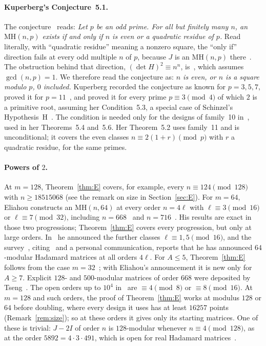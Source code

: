 \documentclass[10pt]{article}
\theoremstyle{remark}
\newcommand{\MH}{\mathrm{MH}}
\begin{document}
\paragraph{Kuperberg's Conjecture~5.1.}
The conjecture~\cite[Conjecture~5.1]{K} reads: \emph{Let $p$ be an odd prime. For all but finitely many $n$, an $\MH(n,p)$ exists if and only if $n$ is even or a quadratic residue of $p$.} Read literally, with ``quadratic residue'' meaning a nonzero square, the ``only if'' direction fails at every odd multiple $n$ of $p$, because $J$ is an $\MH(n,p)$ there~\cite[Lemma~2.3]{K}. The obstruction behind that direction, $(\det H)^2\equiv n^n$, is~\cite[Lemma~2.2]{K}, which assumes $\gcd(n,p)=1$. We therefore read the conjecture as: \emph{$n$ is even, or $n$ is a square modulo $p$, $0$ included.} Kuperberg recorded the conjecture as known for $p=3,5,7$, proved it for $p=11$~\cite[Corollary~5.5]{K}, and proved it for every prime $p\equiv3\pmod4$ of which $2$ is a primitive root, assuming her Condition~5.3, a special case of Schinzel's Hypothesis~H~\cite[Theorem~5.4]{K}. The condition is needed only for the designs of family~10 in~\cite{IT07}, used in her Theorems~5.4 and~5.6. Her Theorem~5.2 uses family~11 and is unconditional; it covers the even classes $n\equiv2(1+r)\pmod p$ with $r$ a quadratic residue, for the same primes.

\paragraph{Powers of $2$.}
At $m=128$, Theorem~\ref{thm:E} covers, for example, every $n\equiv124\pmod{128}$ with $n\ge18515068$ (see the remark on size in Section~\ref{sec:E}). For $m=64$, Eliahou constructs an $\MH(n,64)$ at every order $n=4\ell$ with $\ell\equiv3\pmod{16}$ or $\ell\equiv7\pmod{32}$, including $n=668$~\cite{E25} and $n=716$~\cite[abstract]{E26}. His results are exact in those two progressions; Theorem~\ref{thm:E} covers every progression, but only at large orders. In~\cite{E25} he announced the further classes $\ell\equiv1,5\pmod{16}$, and the survey~\cite[\S5.4]{EKLO}, citing~\cite{E25} and a personal communication, reports that he has announced $64$-modular Hadamard matrices at all orders $4\ell$. For $A\le5$, Theorem~\ref{thm:E} follows from the case $m=32$~\cite{EK01}; with Eliahou's announcement it is new only for $A\ge7$. Explicit $128$- and $500$-modular matrices of order $668$ were deposited by Tseng~\cite{Ts26}. The open orders up to $10^4$ in~\cite[Table~5]{EKLO} are $\equiv4\pmod8$ or $\equiv8\pmod{16}$. At $m=128$ and such orders, the proof of Theorem~\ref{thm:E} works at modulus $128$ or $64$ before doubling, where every design it uses has at least $16257$ points (Remark~\ref{rem:size}); so at these orders it gives only its starting matrices. One of these is trivial: $J-2I$ of order $n$ is $128$-modular whenever $n\equiv4\pmod{128}$, as at the order $5892=4\cdot3\cdot491$, which is open for real Hadamard matrices~\cite[Table~5]{EKLO}.
\end{document}
